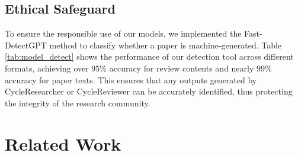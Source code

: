 \documentclass{article} %
\begin{document}
\subsection{Ethical Safeguard}
\begin{table}
\centering
\vspace{-0.6cm}
\caption{Detect Performance Comparison in Different Formats. The human samples are from the test sets of Research-14k and Reviewer-5k.}
\vspace{0.1cm}
\small
\label{tab:model_detect}
\end{table}
To ensure the responsible use of our models, we implemented the Fast-DetectGPT method to classify whether a paper is machine-generated. Table \ref{tab:model_detect} shows the performance of our detection tool across different formats, achieving over 95\% accuracy for review contents and nearly 99\% accuracy for paper texts. This ensures that any outputs generated by CycleResearcher or CycleReviewer can be accurately identified, thus protecting the integrity of the research community.






\section{Related Work}

\end{document}
